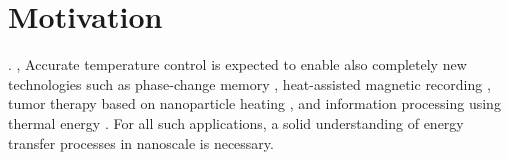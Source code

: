 \label{chap:intro}
\section{Motivation}

 \cite{cahill03,cahill14}.  \cite{snyder08,vineis10,shakouri11},  Accurate temperature control is expected to enable also completely new technologies such as phase-change memory \cite{lankhorst05}, heat-assisted magnetic recording \cite{challener09}, tumor therapy based on nanoparticle heating \cite{avedisian09}, and information processing using thermal energy \cite{li12_rmp}. For all such applications, a solid understanding of energy transfer processes in nanoscale is necessary. %



